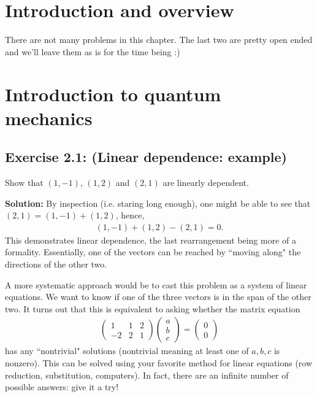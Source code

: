 \documentclass{book}
\begin{document}
\chapter{Introduction and overview}
    There are not many problems in this chapter. The last two are pretty open ended and we'll leave them as is for the time being :)

\chapter{Introduction to quantum mechanics}

\section*{Exercise 2.1: (Linear dependence: example)}
    Show that $(1,-1)$, $(1, 2)$ and $(2, 1)$ are linearly dependent.
    
    \textbf{Solution:} By inspection (i.e. staring long enough), one might be able to see that $(2,1)=(1,-1) + (1,2)$, hence,
    \begin{align}
        (1,-1)+(1,2) -(2,1) = 0.
    \end{align}
    This demonstrates linear dependence, the last rearrangement being more of a formality. Essentially, one of the vectors can be reached by ``moving along" the directions of the other two.
    
    A more systematic approach would be to cast this problem as a system of linear equations. We want to know if one of the three vectors is in the span of the other two. It turns out that this is equivalent to asking whether the matrix equation
    \begin{align}
    \begin{pmatrix}
        1 & 1 & 2 \\
        -2 & 2 & 1
    \end{pmatrix}
    \begin{pmatrix}
        a \\
        b \\
        c
    \end{pmatrix}
    =\begin{pmatrix}
        0 \\ 
        0
    \end{pmatrix}
    \end{align}
    has any ``nontrivial" solutions (nontrivial meaning at least one of $a, b, c$ is nonzero). This can be solved using your favorite method for linear equations (row reduction, substitution, computers). In fact, there are an infinite number of possible answers: give it a try!
\end{document}
